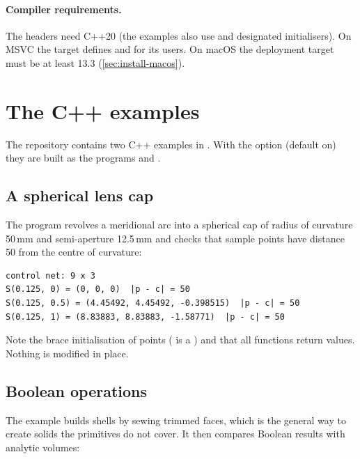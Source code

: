 \paragraph{Compiler requirements.} The headers need C++20 (the examples also use
 and designated initialisers). On MSVC the target defines
 and  for its users. On macOS the deployment target
must be at least 13.3 (\cref{sec:install-macos}).

\section{The C++ examples}\label{sec:cpp-examples}

The repository contains two C++ examples in . With the option
 (default on) they are built as the programs
 and .

\subsection{A spherical lens cap}


The program revolves a meridional arc into a spherical cap of radius of curvature 50\,mm and
semi-aperture 12.5\,mm and checks that sample points have distance 50 from the centre of
curvature:

\begin{lstlisting}[style=text]
control net: 9 x 3
S(0.125, 0) = (0, 0, 0)  |p - c| = 50
S(0.125, 0.5) = (4.45492, 4.45492, -0.398515)  |p - c| = 50
S(0.125, 1) = (8.83883, 8.83883, -1.58771)  |p - c| = 50
\end{lstlisting}

Note the brace initialisation of points ( is a ) and that all
functions return values. Nothing is modified in place.

\subsection{Boolean operations}


The example builds shells by sewing trimmed faces, which is the general way to create solids
the primitives do not cover. It then compares Boolean results with analytic volumes:

